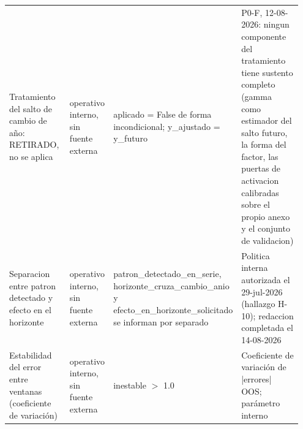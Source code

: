 {\begin{longtable}{@{}>{\raggedright\arraybackslash}p{0.238\linewidth}>{\raggedright\arraybackslash}p{0.152\linewidth}>{\raggedright\arraybackslash}p{0.266\linewidth}>{\raggedright\arraybackslash}p{0.295\linewidth}@{}}
Tratamiento del salto de cambio de año: RETIRADO, no se aplica & operativo interno, sin fuente externa & aplicado = False de forma incondicional; y\_\allowbreak{}ajustado = y\_\allowbreak{}futuro & P0-F, 12-08-2026: ningun componente del tratamiento tiene sustento completo (gamma como estimador del salto futuro, la forma del factor, las puertas de activacion calibradas sobre el propio anexo y el conjunto de validacion) \\
Separacion entre patron detectado y efecto en el horizonte & operativo interno, sin fuente externa & patron\_\allowbreak{}detectado\_\allowbreak{}en\_\allowbreak{}serie, horizonte\_\allowbreak{}cruza\_\allowbreak{}cambio\_\allowbreak{}anio y efecto\_\allowbreak{}en\_\allowbreak{}horizonte\_\allowbreak{}solicitado se informan por separado & Politica interna autorizada el 29-jul-2026 (hallazgo H-10); redaccion completada el 14-08-2026 \\
Estabilidad del error entre ventanas (coeficiente de variación) & operativo interno, sin fuente externa & inestable $>$ 1.0 & Coeficiente de variación de |errores| OOS; parámetro interno \\
\end{longtable}
}

